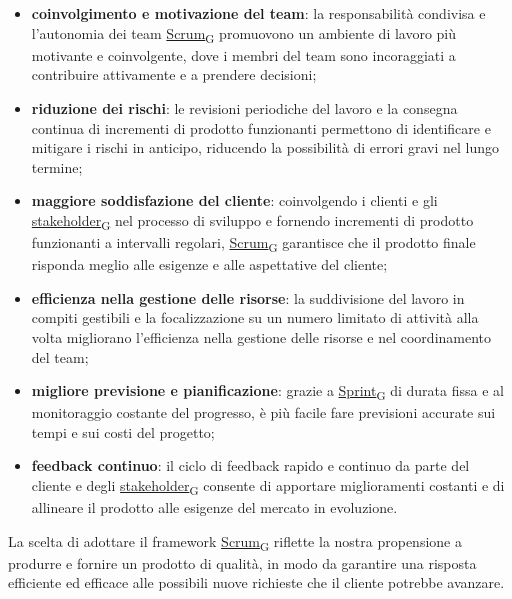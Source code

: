 \begin{itemize}
	\item \textbf{coinvolgimento e motivazione del team}: la responsabilità condivisa e l’autonomia dei team \href{https://7last.github.io/docs/rtb/documentazione-interna/glossario\#scrum}{Scrum\textsubscript{G}} promuovono un ambiente di lavoro più motivante e coinvolgente, dove i membri del team sono incoraggiati a contribuire attivamente e a prendere decisioni;
	\item \textbf{riduzione dei rischi}: le revisioni periodiche del lavoro e la consegna continua di incrementi di prodotto funzionanti permettono di identificare e mitigare i rischi in anticipo, riducendo la possibilità di errori gravi nel lungo termine;
	\item \textbf{maggiore soddisfazione del cliente}: coinvolgendo i clienti e gli \href{https://7last.github.io/docs/rtb/documentazione-interna/glossario\#stakeholder}{stakeholder\textsubscript{G}} nel processo di sviluppo e fornendo incrementi di prodotto funzionanti a intervalli regolari, \href{https://7last.github.io/docs/rtb/documentazione-interna/glossario\#scrum}{Scrum\textsubscript{G}} garantisce che il prodotto finale risponda meglio alle esigenze e alle aspettative del cliente;
	\item \textbf{efficienza nella gestione delle risorse}: la suddivisione del lavoro in compiti gestibili e la focalizzazione su un numero limitato di attività alla volta migliorano l’efficienza nella gestione delle risorse e nel coordinamento del team;
	\item \textbf{migliore previsione e pianificazione}: grazie a \href{https://7last.github.io/docs/rtb/documentazione-interna/glossario\#sprint}{Sprint\textsubscript{G}} di durata fissa e al monitoraggio costante del progresso, è più facile fare previsioni accurate sui tempi e sui costi del progetto;
	\item \textbf{feedback continuo}: il ciclo di feedback rapido e continuo da parte del cliente e degli \href{https://7last.github.io/docs/rtb/documentazione-interna/glossario\#stakeholder}{stakeholder\textsubscript{G}} consente di apportare miglioramenti costanti e di allineare il prodotto alle esigenze del mercato in evoluzione.
\end{itemize}
La scelta di adottare il framework \href{https://7last.github.io/docs/rtb/documentazione-interna/glossario\#scrum}{Scrum\textsubscript{G}} riflette la nostra propensione a produrre e fornire un prodotto di qualità, in modo da garantire una risposta efficiente ed efficace alle possibili nuove richieste che il cliente potrebbe avanzare.

